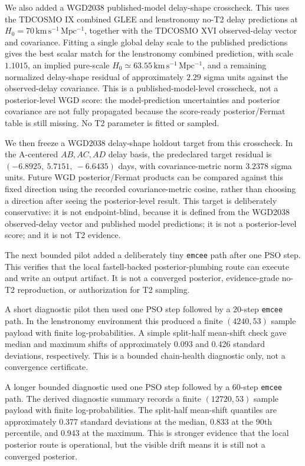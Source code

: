 \documentclass[11pt]{article}
\begin{document}
We also added a WGD2038 published-model delay-shape crosscheck. This uses the
TDCOSMO IX combined GLEE and lenstronomy no-T2 delay predictions at
\(H_0=70\,\mathrm{km\,s^{-1}\,Mpc^{-1}}\), together with the TDCOSMO XVI
observed-delay vector and covariance. Fitting a single global delay scale to
the published predictions gives the best scalar match for the lenstronomy
combined prediction, with scale \(1.1015\), an implied pure-scale
\(H_0\simeq 63.55\,\mathrm{km\,s^{-1}\,Mpc^{-1}}\), and a remaining normalized
delay-shape residual of approximately \(2.29\) sigma units against the
observed-delay covariance. This is a published-model-level crosscheck, not a
posterior-level WGD score: the model-prediction uncertainties and posterior
covariance are not fully propagated because the score-ready posterior/Fermat
table is still missing. No T2 parameter is fitted or sampled.

We then freeze a WGD2038 delay-shape holdout target from this crosscheck. In
the A-centered \(AB,AC,AD\) delay basis, the predeclared target residual is
\((-6.8925,\ 5.7151,\ -6.6435)\) days, with covariance-metric norm
\(3.2378\) sigma units. Future WGD posterior/Fermat products can be compared
against this fixed direction using the recorded covariance-metric cosine,
rather than choosing a direction after seeing the posterior-level result. This
target is deliberately conservative: it is not endpoint-blind, because it is
defined from the WGD2038 observed-delay vector and published model predictions;
it is not a posterior-level score; and it is not T2 evidence.

The next bounded pilot added a deliberately tiny \texttt{emcee} path after
one PSO step. This verifies that the local fastell-backed posterior-plumbing
route can execute and write an output artifact. It is not a converged
posterior, evidence-grade no-T2 reproduction, or authorization for T2
sampling.

A short diagnostic pilot then used one PSO step followed by a 20-step
\texttt{emcee} path. In the lenstronomy environment this produced a finite
\((4240,53)\) sample payload with finite log-probabilities. A simple
split-half mean-shift check gave median and maximum shifts of approximately
0.093 and 0.426 standard deviations, respectively. This is a bounded
chain-health diagnostic only, not a convergence certificate.

A longer bounded diagnostic used one PSO step followed by a 60-step
\texttt{emcee} path. The derived diagnostic summary records a finite
\((12720,53)\) sample payload with finite log-probabilities. The split-half
mean-shift quantiles are approximately 0.377 standard deviations at the
median, 0.833 at the 90th percentile, and 0.943 at the maximum. This is
stronger evidence that the local posterior route is operational, but the
visible drift means it is still not a converged posterior.
\end{document}
